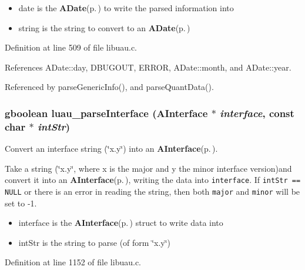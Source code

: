 \begin{itemize}
\item date is the {\bf ADate}{\rm (p.\,\pageref{structADate})} to write the parsed information into \item string is the string to convert to an {\bf ADate}{\rm (p.\,\pageref{structADate})} 
\end{itemize}


Definition at line 509 of file libuau.c.

References ADate::day, DBUGOUT, ERROR, ADate::month, and ADate::year.

Referenced by parse\-Generic\-Info(), and parse\-Quant\-Data().
\subsubsection{\setlength{\rightskip}{0pt plus 5cm}gboolean luau\_\-parse\-Interface ({\bf AInterface} $\ast$ {\em interface}, const char $\ast$ {\em int\-Str})}\label{libuau_8c_a41}


Convert an interface string (\char`\"{}x.y\char`\"{}) into an {\bf AInterface}{\rm (p.\,\pageref{structAInterface})}. 

Take a string (\char`\"{}x.y\char`\"{}, where x is the major and y the minor interface version)and convert it into an {\bf AInterface}{\rm (p.\,\pageref{structAInterface})}, writing the data into {\tt interface}. If {\tt int\-Str == NULL} or there is an error in reading the string, then both {\tt major} and {\tt minor} will be set to -1.

\begin{itemize}
\item interface is the {\bf AInterface}{\rm (p.\,\pageref{structAInterface})} struct to write data into \item int\-Str is the string to parse (of form \char`\"{}x.y\char`\"{}) 
\end{itemize}


Definition at line 1152 of file libuau.c.

